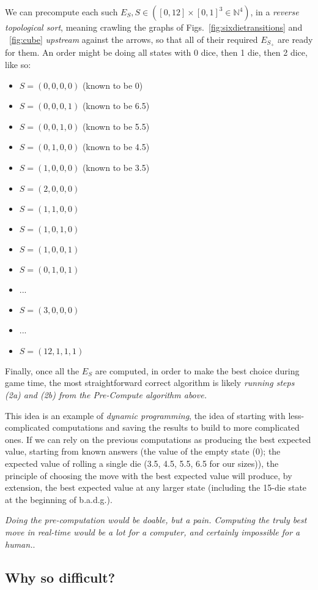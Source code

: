 \documentclass[11pt, oneside]{article} 	%
\begin{document}
We can precompute each such $E_{S}, S \in ([0,12 ] \times [0,1]^3 \in \mathbb{N}^4)$, in a \emph{reverse topological sort}, meaning crawling the graphs of Figs.~\ref{fig:sixdietransitions} and ~\ref{fig:cube} \emph{upstream} against the arrows, so that all of their required $E_{S_+}$ are ready for them.  An order might be doing all states with 0 dice, then 1 die, then 2 dice, like so:
\begin{itemize}
\item $S = (0,0,0,0)$ (known to be 0)
\item $S = (0,0,0,1)$ (known to be 6.5)
\item $S = (0,0,1,0)$ (known to be 5.5)
\item $S = (0,1,0,0)$ (known to be 4.5)
\item $S = (1,0,0,0)$ (known to be 3.5)
\item $S = (2,0,0,0)$
\item $S = (1,1,0,0)$
\item $S = (1,0,1,0)$
\item $S = (1,0,0,1)$
\item $S = (0,1,0,1)$
\item ...
\item $S= (3, 0, 0, 0)$
\item ...
\item $S = (12, 1,  1, 1)$
\end{itemize}

Finally, once all the $E_S$ are computed, in order to make the best choice during game time, the most straightforward correct algorithm is likely \emph{running steps (2a) and (2b) from the Pre-Compute algorithm above.}

This idea is an example of \emph{dynamic programming}, the idea of starting with less-complicated computations and saving the results to build to more complicated ones.  If we can rely on the previous computations as producing the best expected value, starting from known answers (the value of the empty state (0); the expected value of rolling a single die (3.5, 4.5, 5.5, 6.5 for our sizes)), the principle of choosing the move with the best expected value will produce, by extension, the best expected value at any larger state (including the 15-die state at the beginning of b.a.d.g.). 

\emph{Doing the pre-computation would be doable, but a pain.  Computing the truly best move in real-time would be a lot for a computer, and certainly impossible for a human.}.

\subsection{Why so difficult?}
\end{document}
